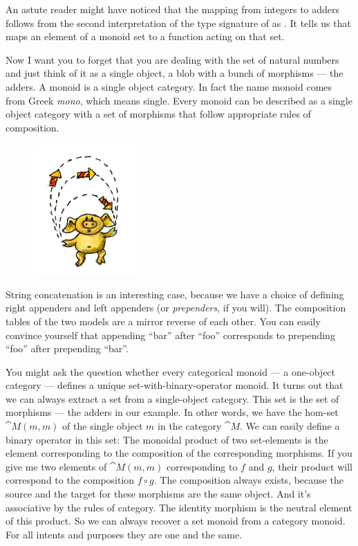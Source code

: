 An astute reader might have noticed that the mapping from integers to
adders follows from the second interpretation of the type signature of
 as . It
tells us that  maps an element of a monoid set to a
function acting on that set.

Now I want you to forget that you are dealing with the set of natural
numbers and just think of it as a single object, a blob with a bunch of
morphisms --- the adders. A monoid is a single object category. In fact
the name monoid comes from Greek \emph{mono}, which means single. Every
monoid can be described as a single object category with a set of
morphisms that follow appropriate rules of composition.

\begin{figure}[H]
\centering
\includegraphics[width=0.35\textwidth]{images/monoid.jpg}
\end{figure}

\noindent
String concatenation is an interesting case, because we have a choice of
defining right appenders and left appenders (or \emph{prependers}, if
you will). The composition tables of the two models are a mirror reverse
of each other. You can easily convince yourself that appending ``bar''
after ``foo'' corresponds to prepending ``foo'' after prepending
``bar''.

You might ask the question whether every categorical monoid --- a
one-object category --- defines a unique set-with-binary-operator
monoid. It turns out that we can always extract a set from a
single-object category. This set is the set of morphisms --- the adders
in our example. In other words, we have the hom-set $\cat{M}(m, m)$ of the
single object $m$ in the category $\cat{M}$. We can easily define a binary
operator in this set: The monoidal product of two set-elements is the
element corresponding to the composition of the corresponding morphisms.
If you give me two elements of $\cat{M}(m, m)$ corresponding to $f$ and
$g$, their product will correspond to the composition
$f \circ g$. The composition always exists, because the source and the
target for these morphisms are the same object. And it's associative by
the rules of category. The identity morphism is the neutral element of
this product. So we can always recover a set monoid from a category
monoid. For all intents and purposes they are one and the same.

